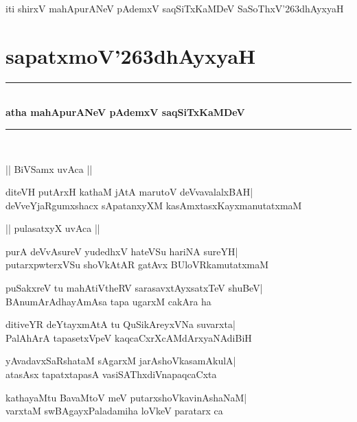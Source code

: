 \documentclass[twoside,12pt,openright]{book}
\def\S{\char'263}
\newcounter{shloka}[chapter]
\begin{document}
\begin{center}
iti shirxV mahApurANeV pAdemxV saqSiTxKaMDeV SaSoThxV\S dhAyxyaH
\end{center}

\chapter{sapatxmoV\S dhAyxyaH}
\begin{center}
\rule{2cm}{1pt}\\[.5cm]
{\LARGE\bfseries atha mahApurANeV pAdemxV saqSiTxKaMDeV}\\[.3cm]
\rule{2cm}{1pt}\\
\end{center}

\begin{center}
|| BiVSamx uvAca ||
\end{center}
\begin{shloka}%
diteVH putArxH kathaM jAtA marutoV deVvavalalxBAH|\\
deVveYjaRgumxshacx sApatanxyXM kasAmxtasxKayxmanutatxmaM
\end{shloka}

\begin{center}
|| pulasatxyX uvAca ||
\end{center}
\begin{shloka}%
purA deVvAsureV yudedhxV hateVSu hariNA sureYH|\\
putarxpwterxVSu shoVkAtAR gatAvx BUloVRkamutatxmaM
\end{shloka}

\begin{shloka}%
puSakxreV tu mahAtiVtheRV sarasavxtAyxsatxTeV shuBeV|\\
BAnumArAdhayAmAsa tapa ugarxM cakAra ha
\end{shloka}

\begin{shloka}%
ditiveYR deYtayxmAtA tu QuSikAreyxVNa suvarxta|\\
PalAhArA tapasetxVpeV kaqcaCxrXcAMdArxyaNAdiBiH
\end{shloka}

\begin{shloka}%
yAvadavxSaRshataM sAgarxM jarAshoVkasamAkulA|\\
atasAsx tapatxtapasA vasiSAThxdiVnapaqcaCxta
\end{shloka}

\begin{shloka}%
kathayaMtu BavaMtoV meV putarxshoVkavinAshaNaM|\\
varxtaM swBAgayxPaladamiha loVkeV paratarx ca 
\end{shloka}
\end{document}
